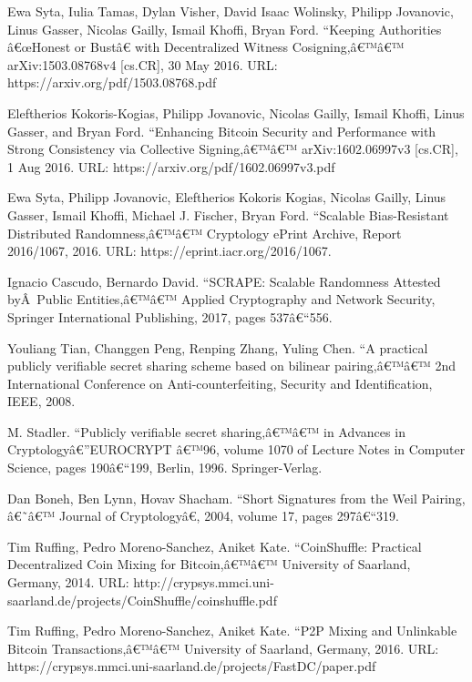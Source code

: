 \documentclass[8pt,fleqn,openany]{book}
\begin{document}
{\begin{thebibliography}{99}
			 Ewa Syta, Iulia Tamas, Dylan Visher, David Isaac Wolinsky, Philipp Jovanovic, Linus Gasser, Nicolas Gailly, Ismail Khoffi, Bryan Ford. ``Keeping Authorities â€œHonest or Bustâ€ with Decentralized Witness Cosigning,â€™â€™ arXiv:1503.08768v4 [cs.CR], 30 May 2016. URL: https://arxiv.org/pdf/1503.08768.pdf
			
			 Eleftherios Kokoris-Kogias, Philipp Jovanovic, Nicolas Gailly,
			Ismail Khoffi, Linus Gasser, and Bryan Ford. ``Enhancing Bitcoin Security and Performance with Strong Consistency via Collective Signing,â€™â€™ arXiv:1602.06997v3 [cs.CR], 1 Aug 2016. URL: https://arxiv.org/pdf/1602.06997v3.pdf
			
			 Ewa Syta, Philipp Jovanovic, Eleftherios Kokoris Kogias, Nicolas Gailly, Linus Gasser, Ismail Khoffi, Michael J. Fischer, Bryan Ford. ``Scalable Bias-Resistant Distributed Randomness,â€™â€™ Cryptology ePrint Archive, Report 2016/1067, 2016. URL: https://eprint.iacr.org/2016/1067.
			
			 Ignacio Cascudo, Bernardo David. ``SCRAPE: Scalable Randomness Attested byÂ Public Entities,â€™â€™ Applied Cryptography and Network Security, Springer International Publishing, 2017, pages 537â€“556.
			
			 Youliang Tian, Changgen Peng, Renping Zhang, Yuling Chen. ``A practical publicly verifiable secret sharing scheme based on bilinear pairing,â€™â€™ 2nd International Conference on Anti-counterfeiting, Security and Identification, IEEE, 2008.
			
			 M. Stadler. ``Publicly verifiable secret sharing,â€™â€™ in Advances in Cryptologyâ€”EUROCRYPT â€™96, volume 1070 of Lecture Notes in Computer Science, pages 190â€“199, Berlin, 1996. Springer-Verlag.
			
			 Dan Boneh, Ben Lynn, Hovav Shacham. ``Short Signatures from the Weil Pairing, â€˜â€™ Journal of Cryptologyâ€, 2004, volume 17, pages 297â€“319.
			
			 Tim Ruffing, Pedro Moreno-Sanchez, Aniket Kate. ``CoinShuffle: Practical Decentralized Coin Mixing for Bitcoin,â€™â€™ University of Saarland, Germany, 2014. URL: http://crypsys.mmci.uni-saarland.de/projects/CoinShuffle/coinshuffle.pdf
			
			 Tim Ruffing, Pedro Moreno-Sanchez, Aniket Kate. ``P2P Mixing and Unlinkable Bitcoin Transactions,â€™â€™ University of Saarland, Germany, 2016. URL: https://crypsys.mmci.uni-saarland.de/projects/FastDC/paper.pdf
			

\end{thebibliography}}
\end{document}
